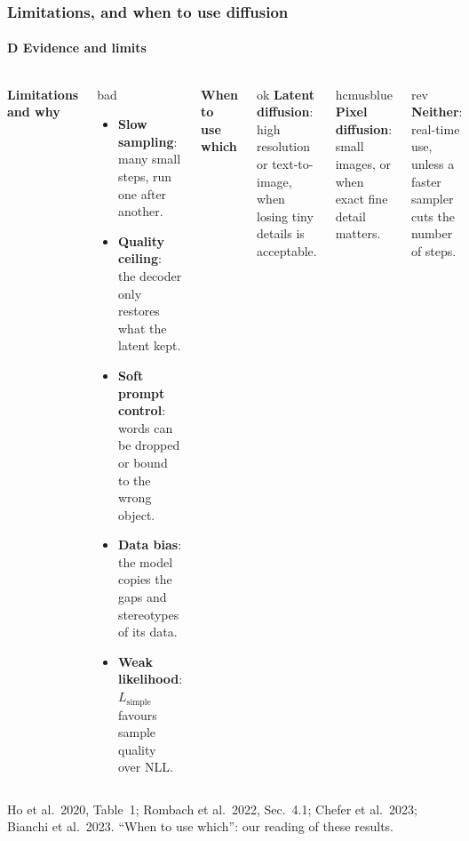 \documentclass[aspectratio=169,9pt,xcolor=table]{beamer}
\newcommand{\src}[1]{\par\vfill{\color{muted}\fontsize{6.2}{7.4}\selectfont #1\par}}
\newcommand{\sech}[1]{{\color{hcmusblue}\small\bfseries #1}\par\vspace{-0.8mm}{\color{hcmusblue!45}\rule{\linewidth}{0.4pt}}\par\vspace{1.2mm}}
\begin{document}
\begin{frame}
\frametitle{Limitations, and when to use diffusion}
\framesubtitle{D \textperiodcentered{} Evidence and limits}
\begin{columns}[T,onlytextwidth]
\sech{Limitations and why}
\begin{nbox}[fontupper=\small\raggedright,colback=bad!4!white,before skip=0pt,after skip=0pt]{bad}
\begin{itemize}\setlength{\itemsep}{3.5pt}
\item \textbf{Slow sampling}: many small steps, run one after another.
\item \textbf{Quality ceiling}: the decoder only restores what the latent kept.
\item \textbf{Soft prompt control}: words can be dropped or bound to the wrong object.
\item \textbf{Data bias}: the model copies the gaps and stereotypes of its data.
\item \textbf{Weak likelihood}: $L_{\text{simple}}$ favours sample quality over NLL.
\end{itemize}
\end{nbox}
\sech{When to use which}
\begin{nbox}[fontupper=\small\raggedright,colback=lightgreen]{ok}
\textbf{Latent diffusion}: high resolution or text-to-image, when losing tiny details is acceptable.
\end{nbox}
\begin{nbox}[fontupper=\small\raggedright,colback=lightblue]{hcmusblue}
\textbf{Pixel diffusion}: small images, or when exact fine detail matters.
\end{nbox}
\begin{nbox}[fontupper=\small\raggedright,colback=lightorange,after skip=0pt]{rev}
\textbf{Neither}: real-time use, unless a faster sampler cuts the number of steps.
\end{nbox}
\end{columns}
\src{Ho et al.\ 2020, Table~1; Rombach et al.\ 2022, Sec.~4.1; Chefer et al.\ 2023; Bianchi et al.\ 2023. ``When to use which'': our reading of these results.}
\end{frame}
\end{document}
